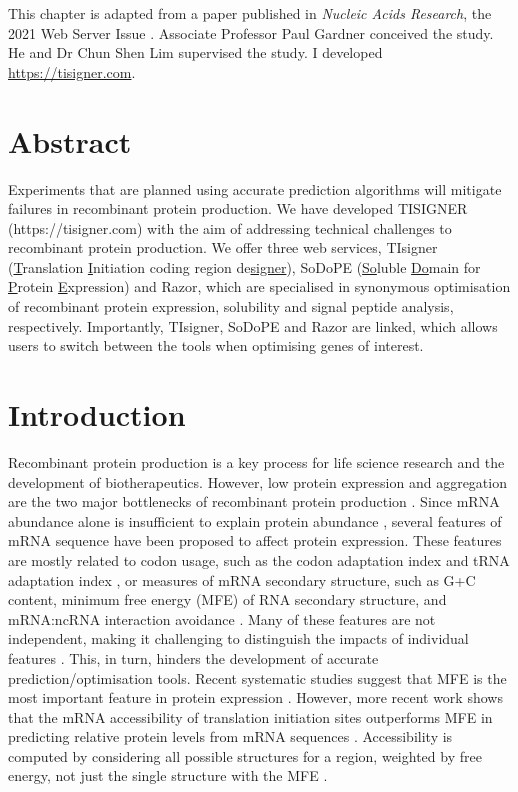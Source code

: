 This chapter is adapted from a paper published in \textit{Nucleic Acids Research}, the 2021 Web Server Issue \cite{bhandaribk2021-nar-gkab175}. Associate Professor Paul Gardner conceived the study. He and Dr Chun Shen Lim supervised the study. I developed \href{https://tisigner.com}{https://tisigner.com}.


\section{Abstract}
Experiments that are planned using accurate prediction algorithms will
mitigate failures in recombinant protein production. We have developed
TISIGNER \\(https://tisigner.com) with the aim of addressing technical
challenges to recombinant protein production. We offer three web
services, TIsigner (\underline{T}ranslation \underline{I}nitiation
coding region de\underline{signer}), SoDoPE (\underline{So}luble
\underline{Do}main for \underline{P}rotein \underline{E}xpression) and
Razor, which are specialised in synonymous optimisation of recombinant
protein expression, solubility and signal peptide analysis,
respectively. Importantly, TIsigner, SoDoPE and Razor are linked, which
allows users to switch between the tools when optimising genes of
interest.


\section{Introduction}

Recombinant protein production is a key process for life science
research and the development of biotherapeutics. However, low protein
expression and aggregation are the two major bottlenecks of recombinant
protein production \cite{Berlec2013-mb,Esposito2006-tj,Hou2018-yd,Kramer2012-wk,Mazurenko2020-pr,Rosano2014-oq,Vihinen2020-ar}.
Since mRNA abundance alone is insufficient to explain protein abundance \cite{Bernstein2002-gg,Abreu2009-zf,Lim2018-rq,Nieuwkoop2020-ph,Taniguchi2010-uq},
several features of mRNA sequence have been proposed to affect protein expression. 
These features are mostly related to codon usage, such as
the codon adaptation index and tRNA adaptation index
\cite{Brule2017-mx,Reis2004-dl,Gutman1989-pn,Sabi2014-je,Sharp1987-ed},
or measures of mRNA secondary structure, such as G+C content, minimum
free energy (MFE) of RNA secondary structure, and mRNA:ncRNA interaction
avoidance
\cite{De_Smit1990-xy,Dvir2013-lq,Kudla2009-tl,Plotkin2011-ak,Tuller2015-ts,Umu2016-zq}.
Many of these features are not independent, making it challenging to
distinguish the impacts of individual features
\cite{mauger2019mrna}. This, in turn, hinders
the development of accurate prediction/optimisation tools. Recent systematic 
studies suggest that MFE is the most important feature in
protein expression \cite{Cambray2018-kn,mauger2019mrna}. However, more 
recent work shows that the mRNA accessibility of translation initiation sites 
outperforms MFE in predicting relative protein levels from mRNA sequences
\cite{Bhandari2021-wd,Terai2020-co}. Accessibility
is computed by considering all possible structures for a region,
weighted by free energy, not just the single structure with the MFE \cite{Bernhart2006-ma}.

